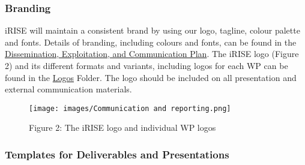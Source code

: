 \documentclass[
]{article}
\begin{document}
\hypertarget{branding}{%
\subsubsection{Branding}\label{branding}}

iRISE will maintain a consistent brand by using our logo, tagline, colour palette and fonts. Details of branding, including colours and fonts, can be found in the \href{https://charitede.sharepoint.com/:w:/r/sites/iRISE/Shared\%20Documents/WP6/iRISE\%20Dissemination\%20Plan_Draft\%201.2.docx?d=w7a63d0ea4a374c1bbe3b7fd98d0c7d2f\&csf=1\&web=1\&e=jY54DT}{Dissemination, Exploitation, and Communication Plan}. The iRISE logo (Figure 2) and its different formats and variants, including logos for each WP can be found in the \href{https://charitede.sharepoint.com/:f:/r/sites/iRISE/Shared\%20Documents/Branding\%20and\%20Website/iRISE\%20Logos/Logos?csf=1\&web=1\&e=mh7pQM}{Logos} Folder. The logo should be included on all presentation and external communication materials.

\begin{figure}
\centering
\texttt{[image: images/Communication and reporting.png]}
\caption{Figure 2: The iRISE logo and individual WP logos}
\end{figure}

\hypertarget{templates-for-deliverables-and-presentations}{%
\subsubsection{Templates for Deliverables and Presentations}\label{templates-for-deliverables-and-presentations}}
\end{document}
